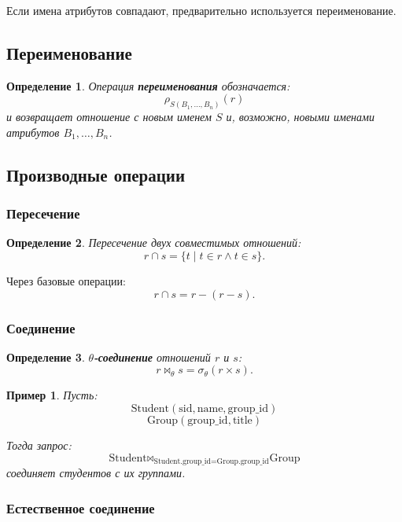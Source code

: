 \documentclass[12pt,a4paper]{article}
\newtheorem{definition}{Определение}[section]
\newtheorem{example}{Пример}[section]
\theoremstyle{remark}
\begin{document}
Если имена атрибутов совпадают, предварительно используется переименование.

\subsection{Переименование}

\begin{definition}
Операция \textbf{переименования} обозначается:
\[
\rho_{S(B_1,\dots,B_n)}(r)
\]
и возвращает отношение с новым именем $S$ и, возможно, новыми именами атрибутов $B_1,\dots,B_n$.
\end{definition}

\subsection{Производные операции}

\subsubsection{Пересечение}

\begin{definition}
Пересечение двух совместимых отношений:
\[
r \cap s = \{t \mid t \in r \wedge t \in s\}.
\]
\end{definition}

Через базовые операции:
\[
r \cap s = r - (r - s).
\]

\subsubsection{Соединение}

\begin{definition}
\textbf{$\theta$-соединение} отношений $r$ и $s$:
\[
r \bowtie_\theta s = \sigma_\theta(r \times s).
\]
\end{definition}

\begin{example}
Пусть:
\[
\text{Student}(\text{sid}, \text{name}, \text{group\_id})
\]
\[
\text{Group}(\text{group\_id}, \text{title})
\]

Тогда запрос:
\[
\text{Student} \bowtie_{\text{Student.group\_id} =
\text{Group.group\_id}} \text{Group}
\]
соединяет студентов с их группами.
\end{example}

\subsubsection{Естественное соединение}
\end{document}
